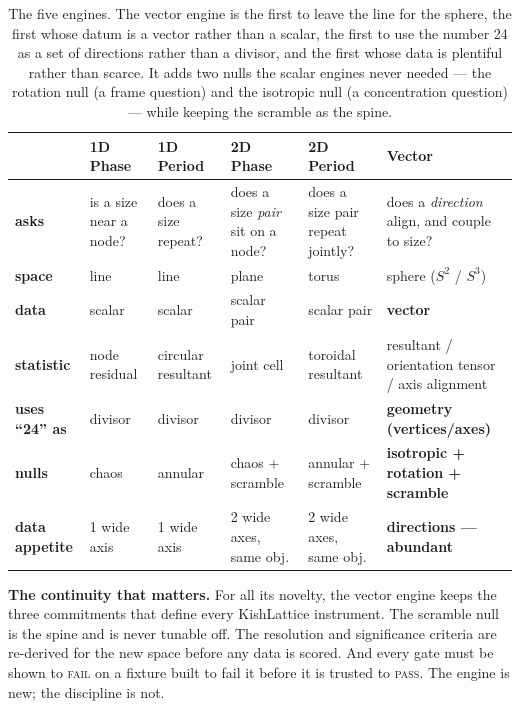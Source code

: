 \documentclass[11pt, letterpaper, openany]{book}
\begin{document}
\begin{table}[H]
\centering
\small
\renewcommand{\arraystretch}{1.25}
\begin{tabular}{@{}p{2.6cm}p{2.0cm}p{2.0cm}p{2.0cm}p{2.0cm}p{2.3cm}@{}}
\toprule
 & \textbf{1D Phase} & \textbf{1D Period} & \textbf{2D Phase} & \textbf{2D Period} & \textbf{Vector} \\
\midrule
\textbf{asks} & is a size near a node? & does a size repeat? & does a size \emph{pair} sit on a node? & does a size pair repeat jointly? & does a \emph{direction} align, and couple to size? \\
\textbf{space} & line & line & plane & torus & sphere ($S^2$ / $S^3$) \\
\textbf{data} & scalar & scalar & scalar pair & scalar pair & \textbf{vector} \\
\textbf{statistic} & node residual & circular resultant & joint cell & toroidal resultant & resultant / orientation tensor / axis alignment \\
\textbf{uses ``24'' as} & divisor & divisor & divisor & divisor & \textbf{geometry (vertices/axes)} \\
\textbf{nulls} & chaos & annular & chaos + scramble & annular + scramble & \textbf{isotropic + rotation + scramble} \\
\textbf{data appetite} & 1 wide axis & 1 wide axis & 2 wide axes, same obj. & 2 wide axes, same obj. & \textbf{directions --- abundant} \\
\bottomrule
\end{tabular}
\caption{The five engines. The vector engine is the first to leave the line for the sphere, the first whose
datum is a vector rather than a scalar, the first to use the number 24 as a set of directions rather than a
divisor, and the first whose data is plentiful rather than scarce. It adds two nulls the scalar engines never
needed --- the rotation null (a frame question) and the isotropic null (a concentration question) --- while
keeping the scramble as the spine.}
\end{table}

\begin{warningbox}
\textbf{The continuity that matters.} For all its novelty, the vector engine keeps the three commitments that
define every KishLattice instrument. The scramble null is the spine and is never tunable off. The resolution
and significance criteria are re-derived for the new space before any data is scored. And every gate must be
shown to \textsc{fail} on a fixture built to fail it before it is trusted to \textsc{pass}. The engine is new;
the discipline is not.
\end{warningbox}
\end{document}
